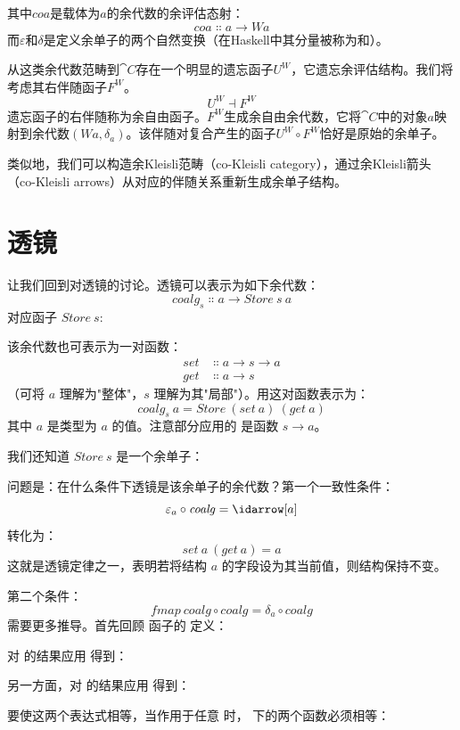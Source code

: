 \noindent
其中$\mathit{coa}$是载体为$a$的余代数的余评估态射：
$$\mathit{coa} \Colon a \to W a$$
而$\varepsilon$和$\delta$是定义余单子的两个自然变换（在Haskell中其分量被称为和）。

从这类余代数范畴到$\cat{C}$存在一个明显的遗忘函子$U^W$，它遗忘余评估结构。我们将考虑其右伴随函子$F^W$。
$$U^W \dashv F^W$$
遗忘函子的右伴随称为余自由函子。$F^W$生成余自由余代数，它将$\cat{C}$中的对象$a$映射到余代数$(W a, \delta_a)$。该伴随对复合产生的函子$U^W \circ F^W$恰好是原始的余单子。

类似地，我们可以构造余Kleisli范畴（co-Kleisli category），通过余Kleisli箭头（co-Kleisli arrows）从对应的伴随关系重新生成余单子结构。

\section{透镜}

让我们回到对透镜的讨论。透镜可以表示为如下余代数：
$$\mathit{coalg}_s \Colon a \to \mathit{Store}\ s\ a$$
对应函子 $\mathit{Store}\ s$:

该余代数也可表示为一对函数：
\begin{align*}
  \mathit{set} & \Colon a \to s \to a \\
  \mathit{get} & \Colon a \to s
\end{align*}
（可将 $a$ 理解为"整体"，$s$ 理解为其"局部"）。用这对函数表示为：
$$\mathit{coalg}_s\ a = \mathit{Store}\ (\mathit{set}\ a)\ (\mathit{get}\ a)$$
其中 $a$ 是类型为 $a$ 的值。注意部分应用的  是函数 $s \to a$。

我们还知道 $\mathit{Store}\ s$ 是一个余单子：

问题是：在什么条件下透镜是该余单子的余代数？第一个一致性条件：
$$\varepsilon_a \circ \mathit{coalg} = \idarrow[a]$$
转化为：
$$\mathit{set}\ a\ (\mathit{get}\ a) = a$$
这就是透镜定律之一，表明若将结构 $a$ 的字段设为其当前值，则结构保持不变。

第二个条件：
$$\mathit{fmap}\ \mathit{coalg} \circ \mathit{coalg} = \delta_a \circ \mathit{coalg}$$
需要更多推导。首先回顾  函子的  定义：

对  的结果应用  得到：

另一方面，对  的结果应用  得到：

要使这两个表达式相等，当作用于任意  时， 下的两个函数必须相等：

